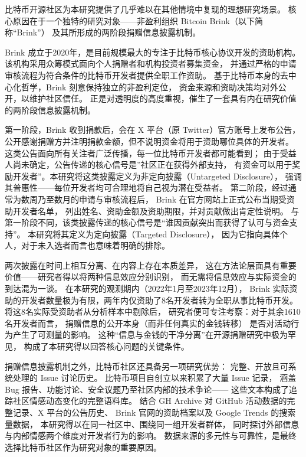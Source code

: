 \documentclass[
    type = master, %
    degree = professional,        %
    decl-page,  %
    twoside,                %
    fontset = fandol %
  ]{njuthesis}
\begin{document}
比特币开源社区为本研究提供了几乎难以在其他情境中复现的理想研究场景。
核心原因在于一个独特的研究对象——非盈利组织 Bitcoin Brink（以下简称“Brink”）
及其所形成的两阶段捐赠信息披露机制。

Brink 成立于2020年，是目前规模最大的专注于比特币核心协议开发的资助机构。
该机构采用众筹模式面向个人捐赠者和机构投资者募集资金，
并通过严格的申请审核流程为符合条件的比特币开发者提供全职工作资助。
基于比特币本身的去中心化哲学，Brink 刻意保持独立的非盈利定位，
资金来源和资助决策均对外公开，以维护社区信任。
正是对透明度的高度重视，催生了一套具有内在研究价值的两阶段信息披露机制。

第一阶段，Brink 收到捐款后，会在 X 平台（原 Twitter）官方账号上发布公告，
公开感谢捐赠方并注明捐款金额，但不说明资金将用于资助哪位具体的开发者。
这类公告面向所有关注者广泛传播，每一位比特币开发者都可能看到；
由于受益人尚未确定，公告传递的核心信号是”社区正在获得外部支持，
有资金可以用于奖励开发者”。本研究将这类披露定义为非定向披露（Untargeted Disclosure），
强调其普惠性——每位开发者均可合理地将自己视为潜在受益者。
第二阶段，经过通常为数周乃至数月的申请与审核流程后，
Brink 在官方网站上正式公布当期受资助开发者名单，
列出姓名、资助金额及资助期限，并对贡献做出肯定性说明。
与第一阶段不同，该类披露传递的核心信号是“谁因贡献突出而获得了认可与资金支持”。
本研究将其定义为定向披露（Targeted Disclosure），
因为它指向具体个人，对于未入选者而言也意味着明确的排除。

两次披露在时间上相互分离、在内容上存在本质差异，
这在方法论层面具有重要价值——研究者得以将两种信息效应分别识别，
而无需将信息效应与实际资金的到达混为一谈。
在本研究的观测期内（2022年1月至2023年12月），
Brink 实际资助的开发者数量极为有限，两年内仅资助了8名开发者转为全职从事比特币开发。
将这8名实际受资助者从分析样本中剔除后，
研究者便可专注考察：对于其余1610名开发者而言，
捐赠信息的公开本身（而非任何真实的金钱转移）
是否对活动行为产生了可测量的影响。
这种“信息与金钱的干净分离”在开源捐赠研究中极为罕见，
构成了本研究得以回答核心问题的关键条件。

捐赠信息披露机制之外，比特币社区还具备另一项研究优势：
完整、开放且可系统处理的 Issue 讨论历史。
比特币项目自创立以来积累了大量 Issue 记录，
涵盖 Bug 报告、功能讨论、安全议题乃至社区内部的技术争论——
这些文本构成了追踪社区情感动态变化的完整语料库。
结合 GH Archive 对 GitHub 活动数据的完整记录、X 平台的公告历史、
Brink 官网的资助档案以及 Google Trends 的搜索量数据，
本研究得以在同一社区中、围绕同一组开发者群体，
同时探讨外部信息与内部情感两个维度对开发者行为的影响。
数据来源的多元性与可靠性，是最终选择比特币社区作为研究对象的重要原因。
\end{document}
